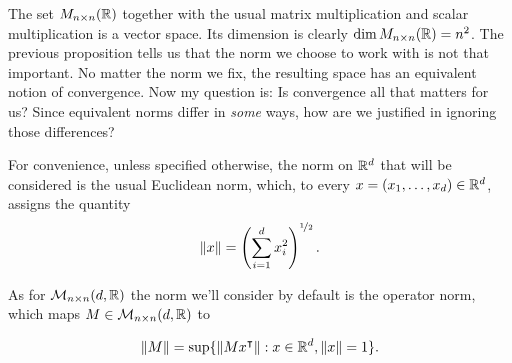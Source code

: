 \begin{note}
	The set $M_{n \times n} (\mathbb{R})$ together with the usual matrix multiplication and scalar multiplication is a vector space. Its dimension is clearly $\dim M_{n \times n} (\mathbb{R}) = n^2$. The previous proposition tells us that the norm we choose to work with is not that important. No matter the norm we fix, the resulting space has an equivalent notion of convergence. Now my question is: Is convergence all that matters for us? Since equivalent norms differ in \textit{some} ways, how are we justified in ignoring those differences?
	
	
\end{note}
For convenience, unless specified otherwise, the norm on $\mathbb{R}^d$ that will be considered is the usual Euclidean norm, which, to every $x = (x_1, \ldots, x_d) \in \mathbb{R}^d$, assigns the quantity
\[
\lVert x \rVert = \left( \sum_{i=1}^d x_i^2 \right)^{\nicefrac{1}{2}}.
\]

As for $\mathcal{M}_{n \times n}(d,\mathbb{R})$ the norm we'll consider by default is the operator norm, which maps $M \in \mathcal{M}_{n \times n}(d,\mathbb{R})$ to

\[
\lVert M \rVert  = \sup \{  \lVert M x^\intercal \rVert  : x \in \mathbb{R}^d, \lVert x \rVert = 1 \}.
\]
